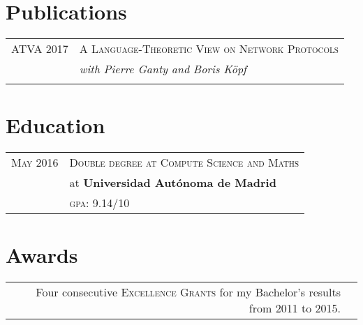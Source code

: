 \documentclass[a4paper,10pt]{article} %
\begin{document}

\section{Publications}
\begin{tabular}{rl}
\textsc{ATVA} 2017 & \textsc{A Language-Theoretic View on Network Protocols} \\
& \textit{with Pierre Ganty and Boris Köpf} \\
&\\
\end{tabular}


\section{Education}
\begin{tabular}{rl}

\textsc{May} 2016 & \textsc{Double degree at Compute Science and Maths}\\
& at \textbf{Universidad Autónoma de Madrid} \\
& \normalsize \textsc{gpa}: 9.14/10 \\
\end{tabular}


\section{Awards}

\begin{tabular}{rl}

Four consecutive \textsc{Excellence Grants} for my Bachelor's results from 2011 to 2015. \\

\end{tabular}

\end{document}
